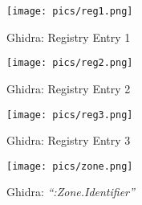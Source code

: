 \documentclass[10pt,a4paper]{article}
\begin{document}
\begin{figure}[!htbp]%
	\centering
	\texttt{[image: pics/reg1.png]}
	\caption{Ghidra: Registry Entry 1}
	\label{reg1}
\end{figure}

\begin{figure}[!htbp]%
	\centering
	\texttt{[image: pics/reg2.png]}
	\caption{Ghidra: Registry Entry 2}
	\label{reg2}
\end{figure}

\begin{figure}[!htbp]%
	\centering
	\texttt{[image: pics/reg3.png]}
	\caption{Ghidra: Registry Entry 3}
	\label{reg3}
\end{figure}

\begin{figure}[!htbp]%
	\centering
	\texttt{[image: pics/zone.png]}
	\caption{Ghidra: \textit{``:Zone.Identifier''}}
	\label{zone}
\end{figure}

\newpage

\printbibliography
\end{document}
